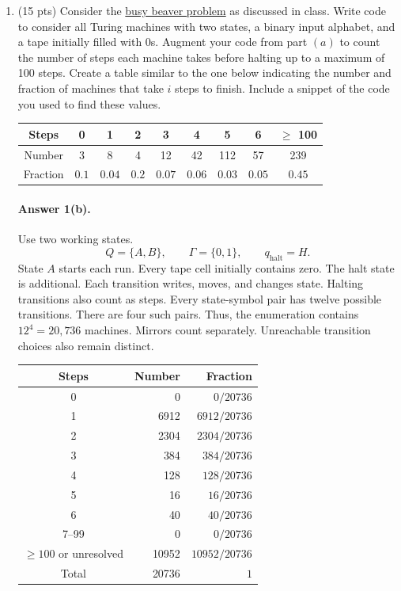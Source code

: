 \documentclass{article}
\begin{document}
\begin{enumerate}
\begin{enumerate}
        \item (15 pts) Consider the \href{https://en.wikipedia.org/wiki/Busy_beaver}{busy beaver problem} as discussed in class. Write code to consider all Turing machines with two states, a binary input alphabet, and a tape initially filled with 0s. Augment your code from part $(a)$ to count the number of steps each machine takes before halting up to a maximum of 100 steps. Create a table similar to the one below indicating the number and fraction of machines that take $i$ steps to finish. Include a snippet of the code you used to find these values.

        \begin{center}
            \hspace*{-1cm}\begin{tabular}{c||c|c|c|c|c|c|c|c}
                Steps & 0 & 1 & 2 & 3 & 4 & 5 & 6 & $\geq$ 100  \\ \hline
                Number & 3 & 8 & 4 & 12 & 42 & 112 & 57 & 239 \\ \hline
                Fraction & $0.1$ & $0.04$ & $0.2$ & $0.07$ & $0.06$ & $0.03$ & $0.05$ & $0.45$
            \end{tabular}
        \end{center}


\paragraph{Answer 1(b).}\mbox{}\par
Use two working states.
\[
Q=\{A,B\},\qquad \Gamma=\{0,1\},\qquad q_{\mathrm{halt}}=H.
\]
State $A$ starts each run.
Every tape cell initially contains zero.
The halt state is additional.
Each transition writes, moves, and changes state.
Halting transitions also count as steps.
Every state-symbol pair has twelve possible transitions.
There are four such pairs.
Thus, the enumeration contains $12^4=20{,}736$ machines.
Mirrors count separately.
Unreachable transition choices also remain distinct.

\begin{center}
\small
\begin{tabular}{c|r|r}
Steps & Number & Fraction \\ \hline
0 & 0 & $0/20736$ \\
1 & 6912 & $6912/20736$ \\
2 & 2304 & $2304/20736$ \\
3 & 384 & $384/20736$ \\
4 & 128 & $128/20736$ \\
5 & 16 & $16/20736$ \\
6 & 40 & $40/20736$ \\
7--99 & 0 & $0/20736$ \\
$\geq 100$ or unresolved & 10952 & $10952/20736$ \\ \hline
Total & 20736 & $1$
\end{tabular}
\end{center}


\end{enumerate}
\end{enumerate}
\end{document}
